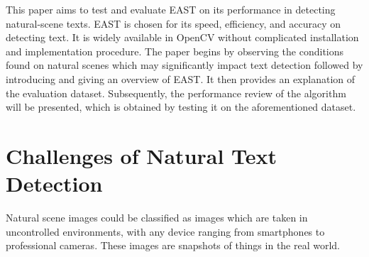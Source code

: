 \documentclass[10pt, a4paper]{article}
\begin{document}
This paper aims to test and evaluate EAST on its performance in detecting natural-scene texts. 
EAST is chosen for its speed, efficiency, and accuracy on detecting text. It is widely available in OpenCV without complicated installation and implementation procedure.
The paper begins by observing the conditions found on natural scenes which may significantly impact text detection followed by introducing and giving an overview of EAST.
It then provides an explanation of the evaluation dataset. Subsequently, the performance review of the algorithm will be presented, which is obtained by testing it on the aforementioned dataset.

\section{Challenges of Natural Text Detection} %
\label{sec:challenges}
Natural scene images could be classified as images which are taken in uncontrolled environments, with any device ranging from smartphones to professional cameras. These images are snapshots of things in the real world.
\end{document}
